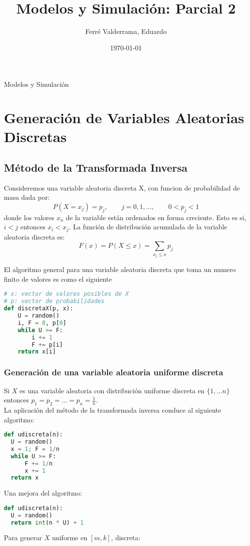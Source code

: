 \documentclass[11pt, a4paper]{article}
\title{Modelos y Simulación: Parcial 2}
\author{Ferré Valderrama, Eduardo}
\date{\today}
\theoremstyle{definition}
\begin{document}
\maketitle
Modelos y Simulación
\tableofcontents

\newpage

\section{Generación de Variables Aleatorias Discretas}

\subsection{Método de la Transformada Inversa}
Consideremos una variable aleatoria discreta X, con funcion de probabilidad de masa dada por:
\[
P(X = x_j) = p_j, \qquad j = 0, 1, \ldots, \qquad 0 < p_j < 1
\]
donde los valores {$x_n$} de la variable están ordenados en forma creciente. Esto es si, $i < j$ entonces $x_i < x_j$. 
La función de distribución acumulada de la variable aleatoria discreta es:
\[
F(x) = P(X \leq x) = \sum_{x_j \leq x} p_j
\]

El algoritmo general para una variable aleatoria discreta que toma un numero finito de valores es como el siguiente
\begin{lstlisting}[language=Python]
# x: vector de valores posibles de X
# p: vector de probabilidades
def discretaX(p, x):
    U = random()
    i, F = 0, p[0]
    while U >= F:
        i += 1
        F += p[i]
    return x[i]
\end{lstlisting}

\subsubsection{Generación de una variable aleatoria uniforme discreta}

Si $X$ es una variable aleatoria con distribución uniforme discreta en $\{1, \ldots n\}$ entonces $p_1 = p_2 = \ldots = p_n = \frac{1}{n}$.
\\ 
La aplicación del método de la transformada inversa conduce al siguiente algoritmo:
\begin{lstlisting}[language=Python]
def udiscreta(n):
  U = random()
  x = 1; F = 1/n
  while U >= F:
      F += 1/n
      x += 1
  return x
\end{lstlisting}
Una mejora del algoritmo:
\begin{lstlisting}[language=Python]
def udiscreta(n):
  U = random()
  return int(n * U) + 1
\end{lstlisting}
\newpage
Para generar $X$ uniforme en $[m, k]$, discreta:
\end{document}
